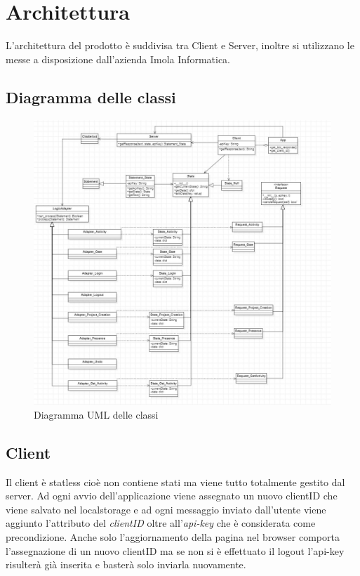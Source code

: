 \section{Architettura}
L'architettura del prodotto è suddivisa tra Client e Server, inoltre si utilizzano le  messe a disposizione dall'azienda Imola Informatica.
\subsection{Diagramma delle classi}
	\begin{figure}[H]
	\centering\includegraphics[scale=0.70]{images/diagramma_classi.jpg}
    \caption{Diagramma UML delle classi}
	\end{figure}
\subsection{Client}
Il client è statless cioè non contiene stati ma viene tutto totalmente gestito dal server.
Ad ogni avvio dell'applicazione viene assegnato un nuovo clientID che viene salvato nel localstorage e ad ogni messaggio inviato dall'utente viene aggiunto l'attributo del \textit{clientID} oltre all'\textit{api-key} che è considerata come precondizione. 
Anche solo l'aggiornamento della pagina nel browser comporta l'assegnazione di un nuovo clientID ma se non si è effettuato il logout l'api-key risulterà già inserita e basterà solo inviarla nuovamente.
